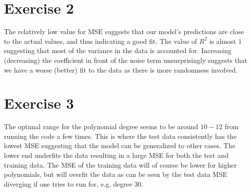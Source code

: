 \documentclass{article}
\begin{document}
\section*{Exercise 2}
The relatively low value for MSE suggests that our model's predictions are close to the actual values, and thus indicating a good fit. The value of $R^2$ is almost $1$ suggesting that most of the variance in the data is accounted for. Increasing (decreasing) the coefficient in front of the noise term unsurprisingly suggests that we have a worse (better) fit to the data as there is more randomness involved.

\section*{Exercise 3}
The optimal range for the polynomial degree seems to be around $10-12$ from running the code a few times. This is where the test data consistently has the lowest MSE suggesting that the model can be generalized to other cases. The lower end underfits the data resulting in a large MSE for both the test and training data. The MSE of the training data will of course be lower for higher polynomials, but will overfit the data as can be seen by the test data MSE diverging if one tries to run for, e.g. degree 30.
\end{document}
